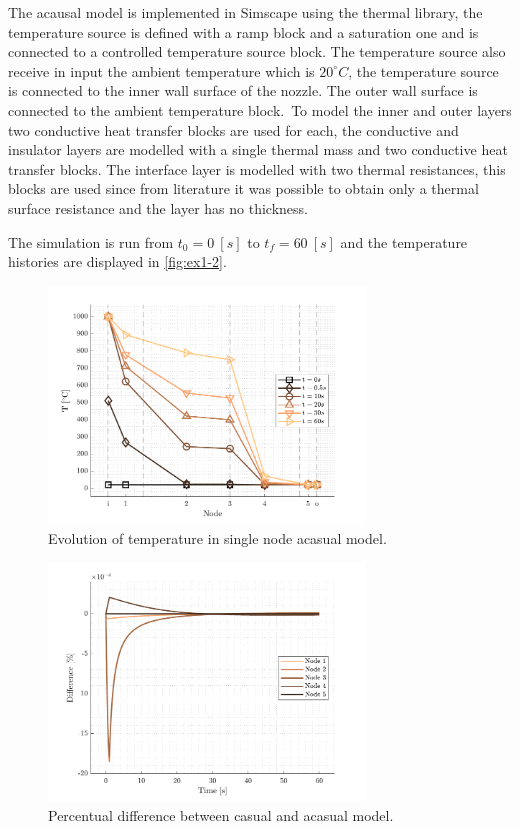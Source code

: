 \documentclass[11pt,a4paper,oneside]{article}
\begin{document}
The acausal model is implemented in Simscape using the thermal library, the temperature source is defined
with a ramp block and a saturation one and is connected to a controlled temperature source block. The temperature
source also receive in input the ambient temperature which is $20^{\circ}C$, the temperature source is connected to
the inner wall surface of the nozzle. The outer wall surface is connected to the ambient temperature block.\
To model the inner and outer layers two conductive heat transfer blocks are used for each, the conductive 
and insulator layers are modelled with a single thermal mass and two conductive heat transfer blocks. 
The interface layer is modelled with two thermal resistances, this blocks are used since from literature it was
possible to obtain only a thermal surface resistance and the layer has no thickness.\

The simulation is run from $t_0=0\ [s]$ to $t_f=60\ [s]$ and the temperature histories are displayed in \autoref{fig:ex1-2}.

\begin{figure}[h!]
    \centering
        \includegraphics[width = 0.75\textwidth]{gfx/ex1-2.pdf}
        \caption{Evolution of temperature in single node acasual model.}\label{fig:ex1-2}
\end{figure}

\begin{figure}[h!]
    \centering
        \includegraphics[width = 0.75\textwidth]{gfx/ex1-5.pdf}
        \caption{Percentual difference between casual and acasual model.}\label{fig:ex1-5}
\end{figure}
\end{document}
